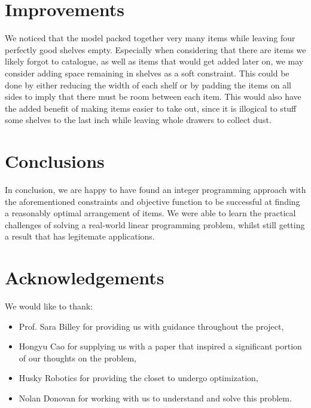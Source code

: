 \documentclass[10pt]{article}
\theoremstyle{named}
\begin{document}
\section{Improvements}
We noticed that the model packed together very many items while leaving four
perfectly good shelves empty. Especially when considering that there are items
we likely forgot to catalogue, as well as items that would get added later on,
we may consider adding space remaining in shelves as a soft constraint. This
could be done by either reducing the width of each shelf or by padding the
items on all sides to imply that there must be room between each item. This
would also have the added benefit of making items easier to take out, since
it is illogical to stuff some shelves to the last inch while leaving whole
drawers to collect dust.

\section{Conclusions}
In conclusion, we are happy to have found an integer programming approach
with the aforementioned constraints and objective function to be successful
at finding a reasonably optimal arrangement of items. We were able to learn
the practical challenges of solving a real-world linear programming problem,
whilst still getting a result that has legitemate applications. 

\section{Acknowledgements}
We would like to thank:
\begin{itemize}
\item Prof. Sara Billey for providing us with guidance throughout the project,
\item Hongyu Cao for supplying us with a paper that inspired a significant portion of our thoughts on the problem,
\item Husky Robotics for providing the closet to undergo optimization,
\item Nolan Donovan for working with us to understand and solve this problem.
\end{itemize}
\end{document}
